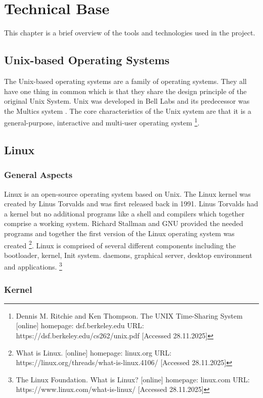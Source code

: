 \section{Technical Base}

This chapter is a brief overview of the tools and technologies used in the project.

\subsection{Unix-based Operating Systems}

The Unix-based operating systems are a family of operating systems. They all have one thing in common which is that they share the design principle of the original Unix System. Unix was developed in Bell Labs and its predecessor was the Multics system \cite{farrow1991}.  The core characteristics of the Unix system are that it is a general-purpose, interactive and multi-user operating system \footnote{Dennis M. Ritchie and Ken Thompson. The UNIX Time-Sharing System [online] homepage: dsf.berkeley.edu URL: https://dsf.berkeley.edu/cs262/unix.pdf [Accessed 28.11.2025]}.

\subsection{Linux}

\subsubsection{General Aspects}

Linux is an open-source operating system based on Unix. The Linux kernel was created by Linus Torvalds and was first released back in 1991. Linus Torvalds had a kernel but no additional programs like a shell and compilers which together comprise a working system. Richard Stallman and GNU provided the needed programs and together the first version of the Linux operating system was created \footnote{What is Linux. [online] homepage: linux.org URL: https://linux.org/threads/what-is-linux.4106/ [Accessed 28.11.2025]}. Linux is comprised of several different components including the bootloader, kernel, Init system. daemons, graphical server, desktop environment and applications. \footnote{The Linux Foundation. What is Linux? [online] homepage: linux.com URL: https://www.linux.com/what-is-linux/ [Accessed 28.11.2025]}

\subsubsection{Kernel}

